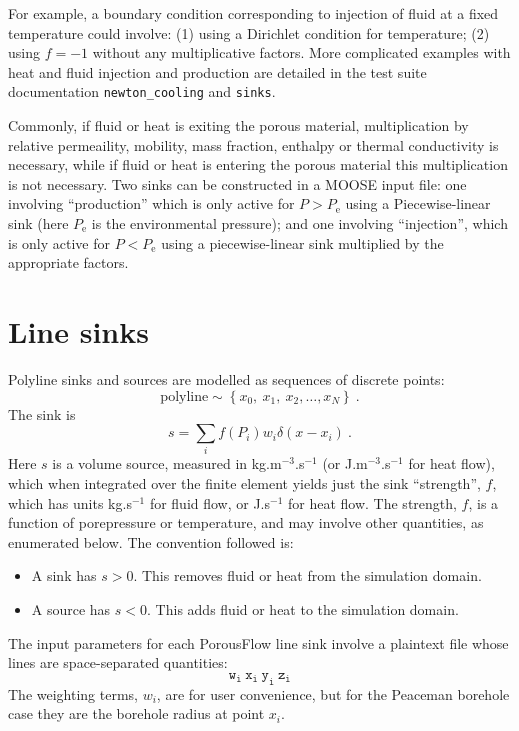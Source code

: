 \documentclass[12pt]{report}
\begin{document}
For example, a boundary condition corresponding to injection of fluid
at a fixed temperature could involve: (1) using a Dirichlet condition
for temperature; (2) using $f=-1$ without any multiplicative factors.
More complicated examples with heat and fluid injection and production
are detailed in the test suite documentation {\tt newton\_cooling} and
{\tt sinks}.

Commonly, if fluid or heat is exiting the porous
material, multiplication by relative permeaility, mobility, mass
fraction, enthalpy or thermal conductivity is necessary, while if
fluid or heat is entering the porous material this multiplication is
not necessary.  Two sinks can be constructed in a MOOSE input file: one involving
``production'' which is only active for $P>P_{\mathrm{e}}$ using a
Piecewise-linear sink (here $P_{\mathrm{e}}$ is the environmental
pressure); and one involving ``injection'', which is only active for
$P<P_{\mathrm{e}}$ using a piecewise-linear sink multiplied by the
appropriate factors.

\section{Line sinks}

Polyline sinks and sources are modelled as sequences of discrete points:
\begin{equation}
\mbox{polyline}\sim \left\{x_{0},\ x_{1},\ x_{2},\ldots,x_{N}\right\} \ .
\end{equation}
The sink is
\begin{equation}
s = \sum_{i}f(P_{i})w_{i}\delta(x - x_{i}) \ .
\label{line.sink.eqn}
\end{equation}
Here $s$ is a volume source, measured in kg.m$^{-3}$.s$^{-1}$ (or
J.m$^{-3}$.s$^{-1}$ for heat flow), which when integrated over the
finite element yields just the sink ``strength'', $f$, which has units
kg.s$^{-1}$ for fluid flow, or J.s$^{-1}$ for heat flow.  
The strength, $f$, is a function of porepressure or temperature, and
may involve other quantities, as enumerated below.  The convention
followed is:
\begin{itemize}
\item A sink has $s>0$.  This removes fluid or heat from the
  simulation domain.
\item A source has $s<0$.  This adds fluid or heat to the simulation
  domain.
\end{itemize}
The input parameters for each PorousFlow line sink involve a plaintext
file whose lines are space-separated quantities:
\begin{equation}
{\mathtt{w_{i}\ x_{i}\ y_{i}\ z_{i}}}
\label{bh.plaintext.format}
\end{equation}
The weighting terms, $w_{i}$, are for user convenience, but for the
Peaceman borehole case they are the borehole radius at point $x_{i}$.
\end{document}
